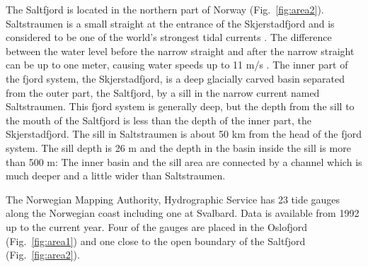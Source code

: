 The Saltfjord is located in the northern part of Norway (Fig.~\ref{fig:area2}). Saltstraumen is a small straight at the entrance of the Skjerstadfjord and is considered to be one of the world's strongest tidal currents \cite[]{gjevik09}. The difference between the water level before the narrow straight and after the narrow straight can be up to one meter, causing water speeds up to 11 m/s \cite[]{eliassen01}.
The inner part of the fjord system, the Skjerstadfjord, is a deep glacially carved basin separated from the outer part, the Saltfjord, by a sill in the narrow current named Saltstraumen. This fjord system is generally deep, but the depth from the sill to the mouth of the Saltfjord is less than the depth of the inner part, the Skjerstadfjord. The sill in Saltstraumen is about 50 km from the head of the fjord system. The sill depth is 26 m and the depth in the basin inside the sill is more than 500 m: The inner basin and the sill area are connected by a channel which is much deeper and a little wider than Saltstraumen.

The Norwegian Mapping Authority, Hydrographic Service has 23 tide gauges along the Norwegian coast including one at Svalbard. Data is available from 1992 up to the current year. Four of the gauges are placed in the Oslofjord  (Fig.~\ref{fig:area1}) and one close to the open boundary of the Saltfjord (Fig.~\ref{fig:area2}).

